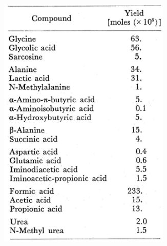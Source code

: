 \documentclass[]{article}
\begin{document}
\begin{figure}[H]
\begin{subfigure}[t]{0.40\textwidth}
		\includegraphics[width=0.90\textwidth]{MillerUrey2}
	\end{subfigure}
\end{figure}
\end{document}
